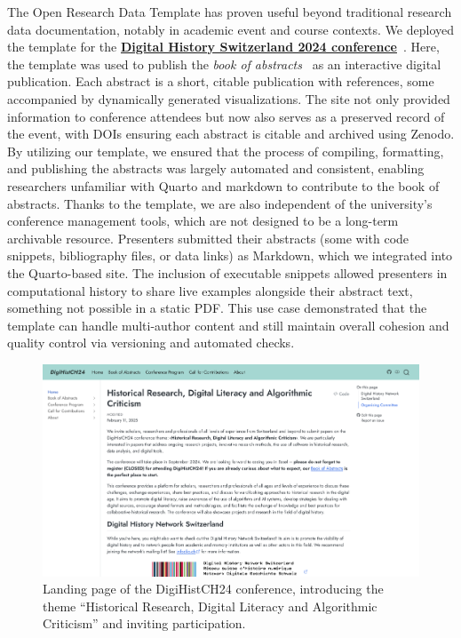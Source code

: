 \documentclass[final]{anthology-ch} %
\begin{document}
The Open Research Data Template has proven useful beyond traditional research data documentation, notably in academic event and course contexts. We deployed the template for the \href{https://digihistch24.github.io/}{\textbf{Digital History Switzerland 2024 conference}}~\cite{baudry2024b}. Here, the template was used to publish the \emph{book of abstracts}~\cite{baudry2024a} as an interactive digital publication. Each abstract is a short, citable publication with references, some accompanied by dynamically generated visualizations. The site not only provided information to conference attendees but now also serves as a preserved record of the event, with DOIs ensuring each abstract is citable and archived using Zenodo. By utilizing our template, we ensured that the process of compiling, formatting, and publishing the abstracts was largely automated and consistent, enabling researchers unfamiliar with Quarto and markdown to contribute to the book of abstracts. Thanks to the template, we are also independent of the university's conference management tools, which are not designed to be a long-term archivable resource. Presenters submitted their abstracts (some with code snippets, bibliography files, or data links) as Markdown, which we integrated into the Quarto-based site. The inclusion of executable snippets allowed presenters in computational history to share live examples alongside their abstract text, something not possible in a static PDF. This use case demonstrated that the template can handle multi-author content and still maintain overall cohesion and quality control via versioning and automated checks.

\begin{figure}[t!]
  \centering
  \includegraphics[width=0.9\linewidth]{figures/digihistch24.png}
  \caption{Landing page of the DigiHistCH24 conference, introducing the theme ``Historical Research, Digital Literacy and Algorithmic Criticism'' and inviting participation.}
  \label{fig-digihist24}
\end{figure}
\end{document}
